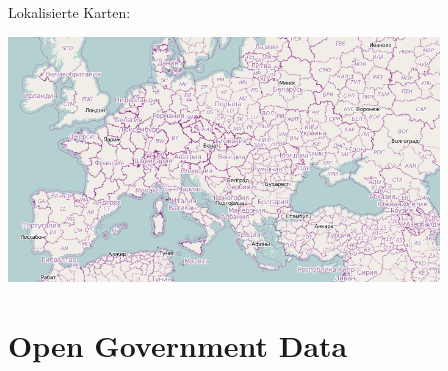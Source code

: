 \documentclass{beamer}
\begin{document}
\begin{frame}{Lokalisierte Karten:}
\begin{center}
\vspace{-1cm}
\includegraphics[height=6.5cm]{style-russ.png}
\end{center}
\end{frame}

\hypersetup{urlcolor=blue}






\section{Open Government Data}
\end{document}
